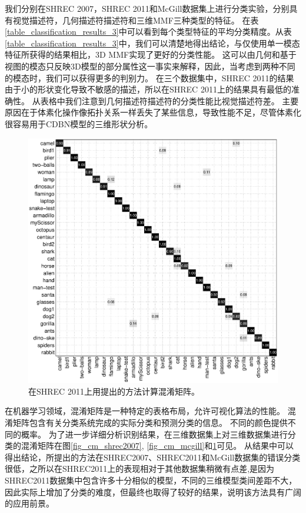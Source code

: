 我们分别在SHREC 2007，SHREC 2011和McGill数据集上进行分类实验，分别具有视觉描述符，几何描述符描述符和三维MMF三种类型的特征。 在表\ref {table_classification_results_3}中可以看到每个类型特征的平均分类精度。从表\ref {table_classification_results_3}中，我们可以清楚地得出结论，与仅使用单一模态特征所获得的结果相比，3D MMF实现了更好的分类性能。 这可以由几何和基于视图的模态只反映3D模型的部分属性这一事实来解释，因此，当考虑到两种不同的模态时，我们可以获得更多的判别力。 在三个数据集中，SHREC 2011的结果由于小的形状变化导致不敏感的描述，所以在SHREC 2011上的结果具有最低的准确性。 从表格中我们注意到几何描述符描述符的分类性能比视觉描述符差。 主要原因在于体素化操作像拓扑关系一样丢失了某些信息，导致性能不足，尽管体素化很容易用于CDBN模型的三维形状分析。
\begin{figure}[hptb]
\begin{center}
\includegraphics[width=0.98\linewidth]{figures/CM2011}
\end{center} 
\vspace{-4mm}
\caption{在SHREC 2011上用提出的方法计算混淆矩阵。} \label{fig_cm_shrec2011}
\end{figure}


在机器学习领域，混淆矩阵是一种特定的表格布局，允许可视化算法的性能。 混淆矩阵包含有关分类系统完成的实际分类和预测分类的信息。 不同的颜色提供不同的概率。 为了进一步详细分析识别结果，在三维数据集上对三维数据集进行分类的混淆矩阵在图\ref {fig_cm_shrec2007}, \ref{fig_cm_mcgill}和\ref {fig_cm_shrec2011}可见。 从结果中可以得出结论，所提出的方法在SHREC2007、SHREC2011和McGill数据集的错误分类很低，之所以在SHREC2011上的表现相对于其他数据集稍微有点差,是因为SHREC2011数据集中包含许多十分相似的模型，不同的三维模型类间差距不大，因此实际上增加了分类的难度，但最终也取得了较好的结果，说明该方法具有广阔的应用前景。


